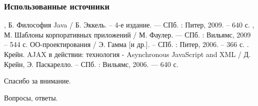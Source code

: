 \documentclass[xcolor=pdftex, dvipsnames, table]{beamer}
\begin{document}
\begin{frame}
  \frametitle{Использованные источники}
  \begin{itemize}
    , Б. Философия Java / Б. Эккель. -- 4-е издание. --- СПб. : Питер, 2009. -- 640 с.
    , М. Шаблоны корпоративных приложений / М. Фаулер. --- СПб. : Вильямс, 2009 -- 544 с.
     ОО-проектирования / Э. Гамма [и др.]. -- СПб. : Питер, 2006. -- 366 с.
    . Крейн. AJAX в действии: технология - Asynchronous JavaScript and XML / Д. Крейн, Э. Паскарелло. -- СПб. : Вильямс, 2006. --- 640 с.
  \end{itemize}

\end{frame}

\begin{frame}
  \begin{center}
    \begin{huge}
      Спасибо за внимание.
    \end{huge}

    Вопросы, ответы.
  \end{center}
\end{frame}
\end{document}

